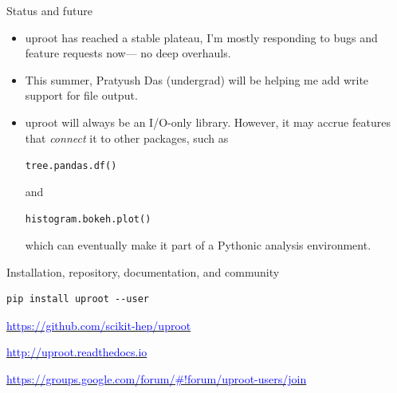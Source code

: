 \documentclass[aspectratio=169]{beamer}
\begin{document}
\begin{frame}{Status and future}
\vspace{0.5 cm}
\begin{center}
\begin{minipage}{0.95\linewidth}
\large
\begin{itemize}\setlength{\itemsep}{0.5 cm}
\item uproot has reached a stable plateau, I'm mostly responding to bugs and feature requests now--- no deep overhauls.
\item This summer, Pratyush Das (undergrad) will be helping me add write support for file output.
\item uproot will always be an I/O-only library. However, it may accrue features that {\it connect} it to other packages, such as

\vspace{0.2 cm}
{\tt\small \hspace{1 cm}tree.pandas.df()}

\vspace{0.2 cm}
and

\vspace{0.2 cm}
{\tt\small \hspace{1 cm}histogram.bokeh.plot()}

\vspace{0.2 cm}
which can eventually make it part of a Pythonic analysis environment.
\end{itemize}
\end{minipage}
\end{center}
\end{frame}

\begin{frame}[fragile]{Installation, repository, documentation, and community}
\vspace{0.5 cm}
\huge
\begin{center}
\begin{minipage}{0.8\linewidth}
\begin{verbatim}
pip install uproot --user
\end{verbatim}
\end{minipage}

\Large
\vspace{1 cm}
\href{https://github.com/scikit-hep/uproot}{\textcolor{blue}{https://github.com/scikit-hep/uproot}}

\vspace{0.5 cm}
\href{http://uproot.readthedocs.io}{\textcolor{blue}{http://uproot.readthedocs.io}}

\vspace{0.5 cm}
\href{https://groups.google.com/forum/#!forum/uproot-users/join}{\textcolor{blue}{https://groups.google.com/forum/\#!forum/uproot-users/join}}
\end{center}
\end{frame}
\end{document}
